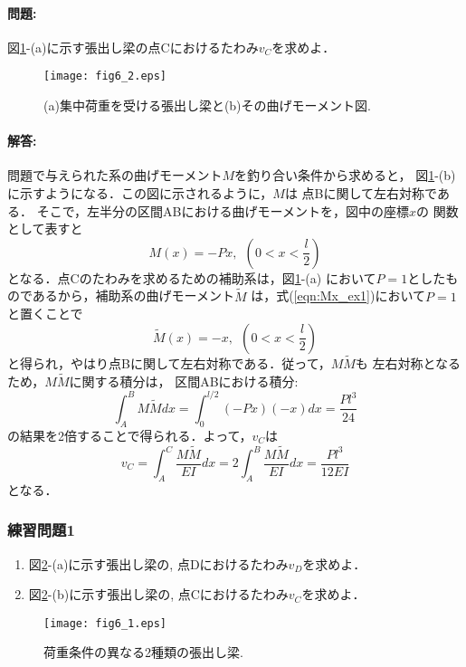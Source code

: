﻿\documentclass[10pt,a4j]{jarticle}
\begin{document}
\paragraph{問題:}
図\ref{fig:fig6_2}-(a)に示す張出し梁の点Cにおけるたわみ$v_C$を求めよ．
\begin{figure}[h]
	\begin{center}
	\texttt{[image: fig6\_2.eps]} 
	\end{center}
	\caption{(a)集中荷重を受ける張出し梁と(b)その曲げモーメント図.} 
	\label{fig:fig6_2}
\end{figure}
\paragraph{解答:}
問題で与えられた系の曲げモーメント$M$を釣り合い条件から求めると，
図\ref{fig:fig6_2}-(b)に示すようになる．この図に示されるように，$M$は
点Bに関して左右対称である．
そこで，左半分の区間ABにおける曲げモーメントを，図中の座標$x$の
関数として表すと
\begin{equation}
	M(x)=-Px,  \ \ \left(0< x < \frac{l}{2} \right) 
	\label{eqn:Mx_ex1}
\end{equation}
となる．点Cのたわみを求めるための補助系は，図\ref{fig:fig6_2}-(a)
において$P=1$としたものであるから，補助系の曲げモーメント$\tilde M$
は，式(\ref{eqn:Mx_ex1})において$P=1$と置くことで
\begin{equation}
	\tilde M(x)=-x,  \ \ \left(0< x < \frac{l}{2} \right) 
	\label{eqn:Mxt_ex1}
\end{equation}
と得られ，やはり点Bに関して左右対称である．従って，$M\tilde M$も
左右対称となるため，$M\tilde M$に関する積分は， 
区間ABにおける積分:
\begin{equation}
	\int _A^B M\tilde M dx = 
	\int_0^{l/2} (-Px)(-x) dx = \frac{Pl^3}{24}
	\label{eqn:}
\end{equation}
の結果を2倍することで得られる．よって，$v_C$は
\begin{equation}
	v_C=\int_A^C \frac{M \tilde M}{EI}dx
	=2\int_A^B \frac{M \tilde M}{EI}dx=
	\frac{Pl^3}{12EI}
	\label{eqn:}
\end{equation}
となる．
\subsubsection{練習問題1}
\begin{enumerate}
\item
	図\ref{fig:fig6_1}-(a)に示す張出し梁の, 点Dにおけるたわみ$v_D$を求めよ．
\item
	図\ref{fig:fig6_1}-(b)に示す張出し梁の, 点Cにおけるたわみ$v_C$を求めよ．
\end{enumerate}
\begin{figure}[h]
	\begin{center}
	\texttt{[image: fig6\_1.eps]} 
	\end{center}
	\caption{荷重条件の異なる2種類の張出し梁.} 
	\label{fig:fig6_1}
\end{figure}
\end{document}
